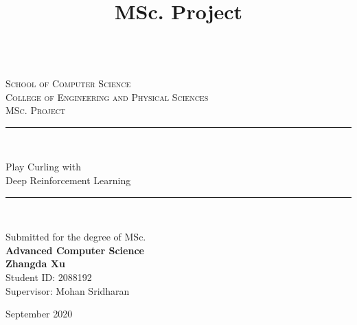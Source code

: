 \documentclass[twoside,12pt,a4paper]{article}
\title{MSc. Project\\\bhamthesistitle}
\author{\textsf{\bhamstudentname }}
\date{}
\newcommand{\bhamstudentname}{Zhangda Xu}
\newcommand{\bhamfronttitle}{Play Curling with \\ Deep Reinforcement Learning}
\newcommand{\bhamschool}{School of Computer Science}
\newcommand{\bhamcollege}{Engineering and Physical Sciences}
\newcommand{\bhamdegree}{Advanced Computer Science}
\newcommand{\bhamid}{2088192}
\newcommand{\bhamsupervisor}{Mohan Sridharan}
\newcommand{\bhamyear}{2020}
\newcommand{\HRule}{\rule{\linewidth}{0.5mm}}
\begin{document}
\begin{titlepage}
\begin{center}
\begin{minipage}{6in}
  \centering
  \hspace*{.2in}
  \end{minipage}
  \\ [1.0cm]
\textsc{{\LARGE \bhamschool\\}College of \bhamcollege}\\[3.5cm]

\textsc{\Large MSc. Project}\\[0.5cm]

\HRule \\[0.4cm]
\begin{center}\Huge
\bhamfronttitle
\end{center}
\HRule \\[1.5cm]

\begin{center}
Submitted for the degree of MSc. \\ \textbf{{\large \bhamdegree}}\\
\vspace{1.5cm}
{\Large \textbf{\bhamstudentname}}\\
Student ID: \bhamid\\
\vspace{1.5cm}
{\Large Supervisor: \bhamsupervisor}
\end{center}
\vfill

{\large September \bhamyear}

\end{center}
\end{titlepage}
\end{document}
